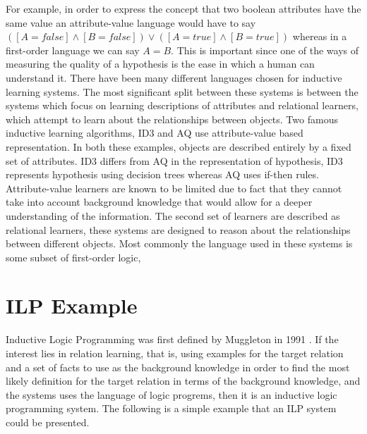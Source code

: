 \documentclass{article}
\begin{document}
For example, in order to express the concept that two boolean attributes have
the same value an attribute-value language would have to say $([A = false]
        \wedge [B = false]) \vee ([A = true] \wedge [B = true])$ whereas in a
first-order language we can say $A = B$. This is important since one of the
ways of measuring the quality of a hypothesis is the ease in which a human can
understand it. There have been many different languages chosen for inductive
learning systems. The most significant split between these systems is between
the systems which focus on learning descriptions of attributes and relational
learners, which attempt to learn about the relationships between objects.
Two famous inductive learning algorithms, ID3 \cite{ide} and AQ \cite{AQ1}
\cite{AQ2} use attribute-value based representation. In both these examples,
objects are described entirely by a fixed set of attributes. ID3 differs from
AQ in the representation of hypothesis, ID3 represents hypothesis using
decision trees whereas AQ uses if-then rules. Attribute-value learners are
known to be limited due to fact that they cannot take into account background
knowledge that would allow for a deeper understanding of the information.
The second set of learners are described as relational learners, these systems
are designed to reason about the relationships between different objects. Most
commonly the language used in these systems is some subset of first-order
logic,

\section{ILP Example}
Inductive Logic Programming was first defined by Muggleton in 1991 \cite{mugg}
\cite{mugg2}. If the interest lies in relation learning, that is, using
examples for the target relation and a set of facts to use as the background
knowledge in order to find the most likely definition for the target relation
in terms of the background knowledge, and the systems uses the language of
logic progrems, then it is an inductive logic programming system. The following
is a simple example that an ILP system could be presented.
\end{document}
